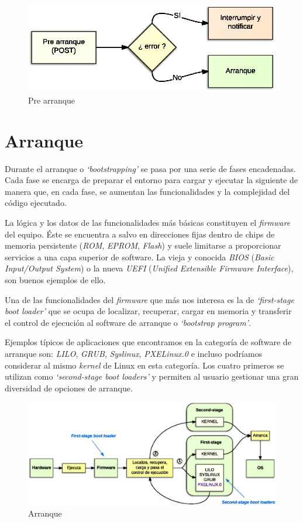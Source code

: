 \documentclass[a4paper,12pt,spanish,final]{epsc_tfc_pfc}
\begin{document}
\begin{figure}[h]
  \centering
    \includegraphics[scale=1]{pre_arranque}
      \caption{Pre arranque}
\end{figure}

\section{Arranque}
Durante el arranque o \emph{`bootstrapping'} se pasa por una serie de fases encadenadas. Cada fase se encarga de preparar el entorno para cargar y ejecutar la siguiente de manera que, en cada fase, se aumentan las funcionalidades y la complejidad del código ejecutado.

La lógica y los datos de las funcionalidades más básicas constituyen el \emph{firmware} del equipo. Éste se encuentra a salvo en direcciones fijas dentro de chips de memoria persistente (\emph{ROM}, \emph{EPROM}, \emph{Flash}) y suele limitarse a proporcionar servicios a una capa superior de software. La vieja y conocida \emph{BIOS} (\emph{Basic Input/Output System}) o la nueva \emph{UEFI} (\emph{Unified Extensible Firmware Interface}), son buenos ejemplos de ello.

Una de las funcionalidades del \emph{firmware} que más nos interesa es la de \emph{`first-stage boot loader'} que se ocupa de localizar, recuperar, cargar en memoria y transferir el control de ejecución al software de arranque o \emph{`bootstrap program'}.

Ejemplos típicos de aplicaciones que encontramos en la categoría de software de arranque son: \emph{LILO}, \emph{GRUB}, \emph{Syslinux}, \emph{PXELinux.0} e incluso podríamos considerar al mismo \emph{kernel} de Linux en esta categoría. Los cuatro primeros se utilizan como \emph{`second-stage boot loaders'} y permiten al usuario gestionar una gran diversidad de opciones de arranque.

\begin{figure}[h]
  \centering
    \includegraphics[scale=0.9]{arranque}
      \caption{Arranque}
\end{figure}
\end{document}
